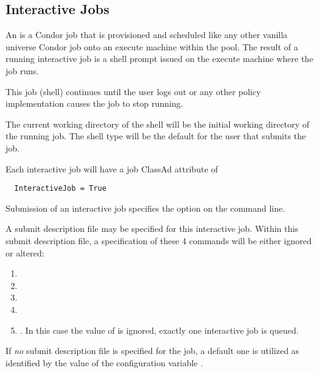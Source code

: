 \subsection{\label{sec:Submit-Interactive}Interactive Jobs}

An  is a Condor job that is provisioned and
scheduled like any other vanilla universe Condor job 
onto an execute machine within the pool.
The result of a running interactive job is a shell prompt 
issued on the execute machine where the job runs.

This job (shell) continues until the user logs out or any other
policy implementation causes the job to stop running.

The current working directory of the shell will be the
initial working directory of the running job.
The shell type will be the default for the user that submits
the job.

Each interactive job will have a job ClassAd attribute of 
\begin{verbatim}
  InteractiveJob = True
\end{verbatim}

Submission of an interactive job specifies the option 
on the  command line.

A submit description file may be specified for this interactive job.
Within this submit description file, 
a specification of these 4 commands will be either ignored or altered:
\begin{enumerate}
\item {}
\item {}
\item {}
\item {}
\item {}.  In this case the value of  is
ignored, exactly one interactive job is queued.
\end{enumerate}

If \emph{no} submit description file is specified for the job,
a default one is utilized as identified by the value of the
configuration variable .

\MoreTodo
